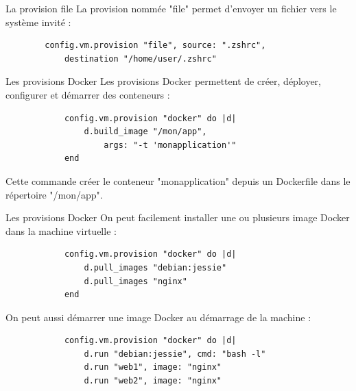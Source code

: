 \documentclass{beamer}
\begin{document}
    \begin{frame}[containsverbatim]{La provision file}
        La provision nommée "file" permet d'envoyer un fichier vers le système invité :
        \begin{verbatim}
        config.vm.provision "file", source: ".zshrc", 
            destination "/home/user/.zshrc"
        \end{verbatim}
    \end{frame}

    \begin{frame}[containsverbatim]{Les provisions Docker}
        Les provisions Docker permettent de créer, déployer, configurer et démarrer des conteneurs : 
        \begin{verbatim}
            config.vm.provision "docker" do |d|
                d.build_image "/mon/app",
                    args: "-t 'monapplication'"
            end
        \end{verbatim}
            Cette commande créer le conteneur "monapplication" depuis un Dockerfile dans le répertoire "/mon/app".
    \end{frame}
    
    \begin{frame}[containsverbatim]{Les provisions Docker}
        On peut facilement installer une ou plusieurs image Docker dans la machine virtuelle :
        \begin{verbatim}
            config.vm.provision "docker" do |d|
                d.pull_images "debian:jessie"
                d.pull_images "nginx"
            end
        \end{verbatim}
        On peut aussi démarrer une image Docker au démarrage de la machine :

        \begin{verbatim}
            config.vm.provision "docker" do |d|
                d.run "debian:jessie", cmd: "bash -l"
                d.run "web1", image: "nginx"
                d.run "web2", image: "nginx"
        \end{verbatim}
    \end{frame}
\end{document}

